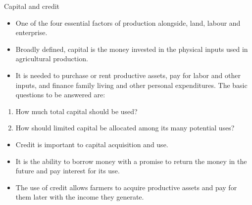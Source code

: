 \documentclass[12pt,ignorenonframetext,aspectratio=169]{beamer}
\providecommand{\tightlist}{%
  \setlength{\itemsep}{0pt}\setlength{\parskip}{0pt}}
\begin{document}
\begin{frame}{Capital and credit}
\protect\hypertarget{capital-and-credit}{}

\begin{itemize}
\tightlist
\item
  One of the four essential factors of production alongside, land,
  labour and enterprise.
\item
  Broadly defined, capital is the money invested in the physical inputs
  used in agricultural production.
\item
  It is needed to purchase or rent productive assets, pay for labor and
  other inputs, and finance family living and other personal
  expenditures. The basic questions to be answered are:
\end{itemize}

\begin{enumerate}
\tightlist
\item
  How much total capital should be used?
\item
  How should limited capital be allocated among its many potential uses?
\end{enumerate}

\begin{itemize}
\tightlist
\item
  Credit is important to capital acquisition and use.
\item
  It is the ability to borrow money with a promise to return the money
  in the future and pay interest for its use.
\item
  The use of credit allows farmers to acquire productive assets and pay
  for them later with the income they generate.
\end{itemize}

\end{frame}
\end{document}

